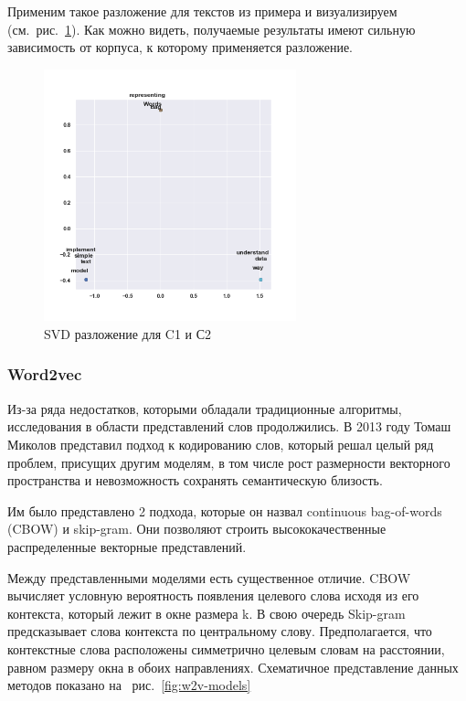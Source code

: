 Применим такое разложение для текстов из примера и визуализируем (см.~рис.~\ref{fig:svd-example}).
Как можно видеть, получаемые результаты имеют сильную зависимость от корпуса, к которому применяется разложение.

\begin{figure}[h]
\centering
\includegraphics[width=0.65\textwidth]{img/svd-example.png}
\caption{\label{fig:svd-example}SVD разложение для C1 и С2}
\end{figure}

\subsubsection{Word2vec}

Из-за ряда недостатков, которыми обладали традиционные алгоритмы, исследования в области представлений слов продолжились. В 2013 году Томаш Миколов представил\autocite{DBLP:journals/corr/abs-1301-3781} подход к кодированию слов, который решал целый ряд проблем, присущих другим моделям, в том числе рост размерности векторного пространства и невозможность сохранять семантическую близость.

Им было представлено 2 подхода, которые он назвал continuous bag-of-words (CBOW) и skip-gram. Они позволяют строить высококачественные распределенные векторные представлений.

Между представленными моделями есть существенное отличие. CBOW вычисляет условную вероятность появления целевого слова исходя из его контекста,  который лежит в окне размера k. В свою очередь Skip-gram предсказывает слова контекста по центральному слову. Предполагается, что контекстные слова расположены симметрично целевым словам на расстоянии, равном размеру окна в обоих направлениях. Схематичное представление данных методов показано на ~рис.~\ref{fig:w2v-models}


